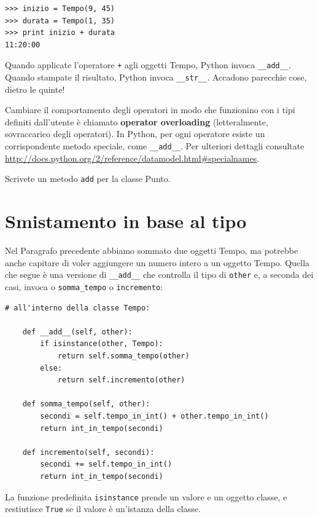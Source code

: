 \documentclass[10pt]{book}
\begin{document}
\begin{verbatim}
>>> inizio = Tempo(9, 45)
>>> durata = Tempo(1, 35)
>>> print inizio + durata
11:20:00
\end{verbatim}
%
Quando applicate l'operatore {\tt +} agli oggetti Tempo, Python invoca
\verb"__add__".  Quando stampate il risultato, Python invoca 
\verb"__str__".  Accadono parecchie cose, dietro le quinte!

Cambiare il comportamento degli operatori in modo che funzionino con i tipi definiti dall'utente è chiamato {\bf operator overloading} (letteralmente, sovraccarico degli operatori). In Python, per ogni operatore esiste un corrispondente metodo speciale, come
\verb"__add__".  Per ulteriori dettagli consultate
\url{http://docs.python.org/2/reference/datamodel.html#specialnames}.

\vspace{0.2in}
\begin{exercise}

Scrivete un metodo {\tt add} per la classe Punto.  

\end{exercise}


\section{Smistamento in base al tipo}

Nel Paragrafo precedente abbiamo sommato due oggetti Tempo, ma potrebbe anche capitare di voler aggiungere un numero intero a un oggetto Tempo. Quella che segue è una versione di \verb"__add__"
che controlla il tipo di {\tt other} e, a seconda dei casi, invoca o
\verb"somma_tempo" o {\tt incremento}:

\begin{verbatim}
# all'interno della classe Tempo:

    def __add__(self, other):
        if isinstance(other, Tempo):
            return self.somma_tempo(other)
        else:
            return self.incremento(other)

    def somma_tempo(self, other):
        secondi = self.tempo_in_int() + other.tempo_in_int()
        return int_in_tempo(secondi)

    def incremento(self, secondi):
        secondi += self.tempo_in_int()
        return int_in_tempo(secondi)
\end{verbatim}
%
La funzione predefinita {\tt isinstance} prende un valore e un oggetto classe, e restiutisce {\tt True} se il valore è un'istanza della classe.
\end{document}
